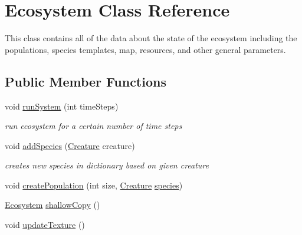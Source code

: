 \hypertarget{class_ecosystem}{}\section{Ecosystem Class Reference}
\label{class_ecosystem}


This class contains all of the data about the state of the ecosystem including the populations, species templates, map, resources, and other general parameters.  


\subsection*{Public Member Functions}
\begin{DoxyCompactItemize}
\item 
void \mbox{\hyperlink{class_ecosystem_a2102d1d4f820c9913cccaf917df9879f}{run\+System}} (int time\+Steps)
\begin{DoxyCompactList}\small\item\em run ecosystem for a certain number of time steps \end{DoxyCompactList}\item 
void \mbox{\hyperlink{class_ecosystem_a3d2b11c7fe8b6699eee72fc77fa02d1d}{add\+Species}} (\mbox{\hyperlink{class_creature}{Creature}} creature)
\begin{DoxyCompactList}\small\item\em creates new species in dictionary based on given creature \end{DoxyCompactList}\item 
void \mbox{\hyperlink{class_ecosystem_a887af939d4bf8e17701dc1a4af875e7f}{create\+Population}} (int size, \mbox{\hyperlink{class_creature}{Creature}} \mbox{\hyperlink{class_ecosystem_a3cd0f83955fce1623326b58666a6a9af}{species}})
\item 
\mbox{\hyperlink{class_ecosystem}{Ecosystem}} \mbox{\hyperlink{class_ecosystem_a0e082a9b5c6e6df9cbe20da26d1d6968}{shallow\+Copy}} ()
\item 
void \mbox{\hyperlink{class_ecosystem_a24d493832618dbfccb61812635c2fbdf}{update\+Texture}} ()
\end{DoxyCompactItemize}
